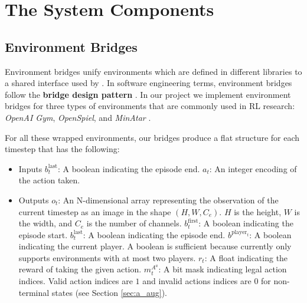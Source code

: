 \section{The \moozi System Components}
\subsection{Environment Bridges} \label{sec:env_bridge}
Environment bridges unify environments which are defined in different libraries to a shared interface used by \moozi.
In software engineering terms, environment bridges follow the \textbf{bridge design pattern} \cite{BridgePattern__2022}.
In our project we implement environment bridges for three types of environments that are commonly used in RL research: \textit{OpenAI Gym}, \textit{OpenSpiel}, and \textit{MinAtar} \cite{OpenAIGym_Brockman.Cheung.ea_2016,OpenSpielFrameworkReinforcement_Lanctot.Lockhart.ea_2020,MinAtarAtariInspiredTestbed_Young.Tian_2019}.

For all these wrapped environments, our bridges produce a flat structure for each timestep that has the following:
\begin{itemize}
    \item Inputs
          \subitem $b^{\text{last}}_{t}$: A boolean indicating the episode end.
          \subitem $a_t$: An integer encoding of the action taken.
    \item Outputs
          \subitem $o_t$:
          An N-dimensional array representing the observation of the current timestep as an image
          in the shape $(H, W, C_e)$. $H$ is the height, $W$ is the width, and $C_e$ is the number of channels.
          \subitem $b^{\text{first}}_{t}$: A boolean indicating the episode start.
          \subitem $b^{\text{last}}_{t}$: A boolean indicating the episode end.
          \subitem $b^{\text{player}_{t}}$: A boolean indicating the current player. A boolean is sufficient because \moozi currently only supports environments with at most two players.
          \subitem $r_t$: A float indicating the reward of taking the given action.
          \subitem $m^{A^a}_t$: A bit mask indicating legal action indices. Valid
          action indices are $1$ and invalid actions indices are $0$ for non-terminal states (see Section \ref{sec:a_aug}).
\end{itemize}

